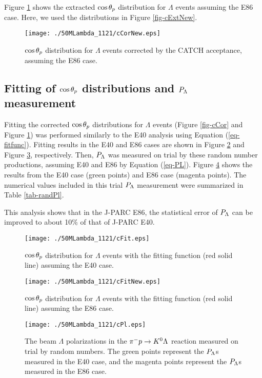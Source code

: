 Figure \ref{fig-cCorNew} shows the extracted $\cos{\theta_p}$ distribution for $\Lambda$ events assuming the E86 case. Here, we used the distributions in Figure \ref{fig-cExtNew}. 

\begin{figure}[h]
  \centering
  \texttt{[image: ./50MLambda\_1121/cCorNew.eps]}
  \caption{$\cos{\theta_p}$ distribution for $\Lambda$ events corrected by the CATCH acceptance, assuming the E86 case.}
  \label{fig-cCorNew}
\end{figure}


\clearpage
\subsection{Fitting of $\cos{\theta_p}$ distributions and $P_{\Lambda}$ measurement}
\label{subsec-randfit}

Fitting the corrected $\cos{\theta_p}$ distributions for $\Lambda$ events (Figure \ref{fig-cCor} and Figure \ref{fig-cCorNew}) was performed similarly to the E40 analysis using Equation (\ref{eq-fitfunc}). Fitting results in the E40 and E86 cases are shown in Figure \ref{fig-cFit} and Figure \ref{fig-cFitNew}, respectively. Then, $P_{\Lambda}$ was measured on trial by these random number productions, assuming E40 and E86 by Equation (\ref{eq-PL}). Figure \ref{fig-cPl} shows the results from the E40 case (green points) and E86 case (magenta points). The numerical values included in this trial $P_{\Lambda}$ measurement were summarized in Table \ref{tab-randPl}.

This analysis shows that in the J-PARC E86, the statistical error of $P_{\Lambda}$ can be improved to about 10\% of that of J-PARC E40.

\begin{figure}[h]
  \centering
  \texttt{[image: ./50MLambda\_1121/cFit.eps]}
  \caption{$\cos{\theta_p}$ distribution for $\Lambda$ events with the fitting function (red solid line) assuming the E40 case.}
  \label{fig-cFit}
\end{figure}

\begin{figure}[h]
  \centering
  \texttt{[image: ./50MLambda\_1121/cFitNew.eps]}
  \caption{$\cos{\theta_p}$ distribution for $\Lambda$ events with the fitting function (red solid line) assuming the E86 case.}
  \label{fig-cFitNew}
\end{figure}

\begin{figure}[h]
  \centering
  \texttt{[image: ./50MLambda\_1121/cPl.eps]}
  \caption{The beam $\Lambda$ polarizations in the $\pi^- p \to K^0 \Lambda$ reaction measured on trial by random numbers. The green points represent the $P_{\Lambda}$s measured in the E40 case, and the magenta points represent the $P_{\Lambda}$s measured in the E86 case.}
  \label{fig-cPl}
\end{figure}

